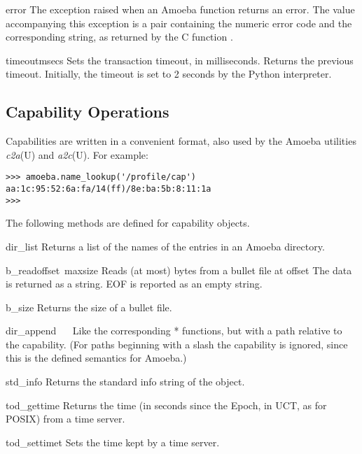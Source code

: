 \begin{excdesc}{error}
The exception raised when an Amoeba function returns an error.
The value accompanying this exception is a pair containing the numeric
error code and the corresponding string, as returned by the C function
.
\end{excdesc}

\begin{funcdesc}{timeout}{msecs}
Sets the transaction timeout, in milliseconds.
Returns the previous timeout.
Initially, the timeout is set to 2 seconds by the Python interpreter.
\end{funcdesc}

\subsection{Capability Operations}

Capabilities are written in a convenient \ASCII{} format, also used by the
Amoeba utilities
{\it c2a}(U)
and
{\it a2c}(U).
For example:

\bcode\begin{verbatim}
>>> amoeba.name_lookup('/profile/cap')
aa:1c:95:52:6a:fa/14(ff)/8e:ba:5b:8:11:1a
>>> 
\end{verbatim}\ecode

The following methods are defined for capability objects.

\renewcommand{\indexsubitem}{(capability method)}
\begin{funcdesc}{dir_list}{}
Returns a list of the names of the entries in an Amoeba directory.
\end{funcdesc}

\begin{funcdesc}{b_read}{offset\, maxsize}
Reads (at most)
bytes from a bullet file at offset
The data is returned as a string.
EOF is reported as an empty string.
\end{funcdesc}

\begin{funcdesc}{b_size}{}
Returns the size of a bullet file.
\end{funcdesc}

\begin{funcdesc}{dir_append}{}
\ 
\ 
Like the corresponding
*
functions, but with a path relative to the capability.
(For paths beginning with a slash the capability is ignored, since this
is the defined semantics for Amoeba.)
\end{funcdesc}

\begin{funcdesc}{std_info}{}
Returns the standard info string of the object.
\end{funcdesc}

\begin{funcdesc}{tod_gettime}{}
Returns the time (in seconds since the Epoch, in UCT, as for POSIX) from
a time server.
\end{funcdesc}

\begin{funcdesc}{tod_settime}{t}
Sets the time kept by a time server.
\end{funcdesc}
